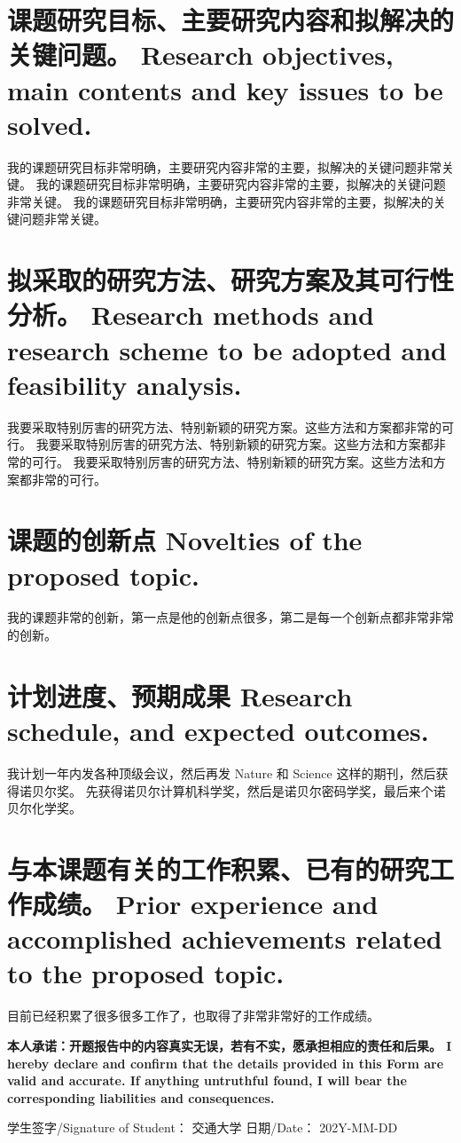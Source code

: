 \documentclass[a4paper,zihao=-4,AutoFakeBold]{ctexart}
\begin{document}
\section{课题研究目标、主要研究内容和拟解决的关键问题。 
    Research objectives, main contents and key issues to be solved.}

我的课题研究目标非常明确，主要研究内容非常的主要，拟解决的关键问题非常关键。
我的课题研究目标非常明确，主要研究内容非常的主要，拟解决的关键问题非常关键。
我的课题研究目标非常明确，主要研究内容非常的主要，拟解决的关键问题非常关键。



\section{拟采取的研究方法、研究方案及其可行性分析。
    Research methods and research scheme to be adopted 
    and feasibility analysis.}

我要采取特别厉害的研究方法、特别新颖的研究方案。这些方法和方案都非常的可行。
我要采取特别厉害的研究方法、特别新颖的研究方案。这些方法和方案都非常的可行。
我要采取特别厉害的研究方法、特别新颖的研究方案。这些方法和方案都非常的可行。



\section{课题的创新点 Novelties of the proposed topic.}

我的课题非常的创新，第一点是他的创新点很多，第二是每一个创新点都非常非常的创新。



\section{计划进度、预期成果 Research schedule, and expected outcomes.}

我计划一年内发各种顶级会议，然后再发 Nature 和 Science 这样的期刊，然后获得诺贝尔奖。
先获得诺贝尔计算机科学奖，然后是诺贝尔密码学奖，最后来个诺贝尔化学奖。



\section{与本课题有关的工作积累、已有的研究工作成绩。
    Prior experience and accomplished achievements 
    related to the proposed topic.}


目前已经积累了很多很多工作了，也取得了非常非常好的工作成绩。




\vspace{\baselineskip}

\bfseries\fangsong%
\noindent
本人承诺：开题报告中的内容真实无误，若有不实，愿承担相应的责任和后果。
I hereby declare and confirm that the details 
provided in this Form are valid and accurate. 
If anything untruthful found, 
I will bear the corresponding liabilities and consequences.

\vspace{\baselineskip}

\noindent
学生签字/Signature of Student： 交通大学
\hfill              
日期/Date： 202Y-MM-DD
\end{document}

